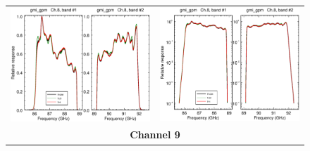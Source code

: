 \begin{figure}[H]
\begin{tabular}{c c}
    \includegraphics[scale=0.35]{graphics/lin/gmi_gpm-8.eps} &
    \includegraphics[scale=0.35]{graphics/log/gmi_gpm-8.eps} \\
    \multicolumn{2}{c}{\sffamily\textbf{Channel 9}}\\

\end{tabular}
\end{figure}
